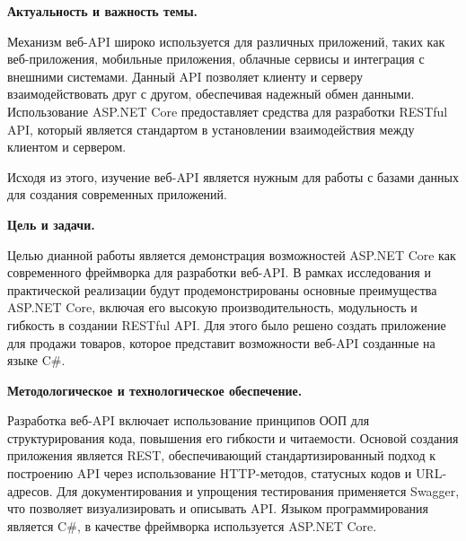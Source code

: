 \documentclass[a4paper,12pt]{report}
\begin{document}


\clearpage
\tableofcontents

\clearpage
{}
\begin{acronym}[JPEG]
    \acro{}{}
\end{acronym}




\textbf{Актуальность и важность темы.}

Механизм веб-\acs{API} широко используется для различных приложений, таких как веб-приложения, мобильные приложения, 
облачные сервисы и интеграция с внешними системами. Данный \acs{API} позволяет клиенту и серверу взаимодействовать друг с другом, 
обеспечивая надежный обмен данными. Использование ASP.NET Core предоставляет средства для разработки \acs{REST}ful \acs{API}, 
который является стандартом в установлении взаимодействия между клиентом и сервером.

Исходя из этого, изучение веб-\acs{API} является нужным для работы с базами данных для создания современных приложений.

\textbf{Цель и задачи.}

Целью дианной работы является демонстрация возможностей ASP.NET Core как современного фреймворка для разработки веб-\acs{API}. 
В рамках исследования и практической реализации будут продемонстрированы основные преимущества ASP.NET Core, включая его 
высокую производительность, модульность и гибкость в создании \acs{REST}ful \acs{API}. Для этого было решено создать приложение для 
продажи товаров, которое представит возможности веб-\acs{API} созданные на языке C\#.

\textbf{Методологическое и технологическое обеспечение.}

Разработка веб-\acs{API} включает использование принципов \acs{ООП} для структурирования кода, повышения его гибкости и читаемости. 
Основой создания приложения является \ac{REST}, обеспечивающий стандартизированный подход к построению \acs{API} через использование 
\acs{HTTP}-методов, статусных кодов и \acs{URL}-адресов. Для документирования и упрощения тестирования применяется Swagger, что позволяет 
визуализировать и описывать \acs{API}. Языком программирования является C\#, в качестве фреймворка используется ASP.NET Core.
\end{document}
